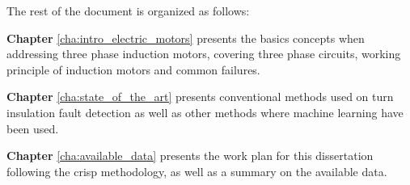 The rest of the document is organized as follows:

\textbf{Chapter} \ref{cha:intro_electric_motors} presents the basics concepts when addressing three phase induction motors, covering three phase circuits, working principle of induction motors and common failures.

\textbf{Chapter} \ref{cha:state_of_the_art} presents conventional methods used on turn insulation fault detection as well as other methods where machine learning have been used.

\textbf{Chapter} \ref{cha:available_data} presents the work plan for this dissertation following the \acrshort{crisp} methodology, as well as a summary on the available data.
